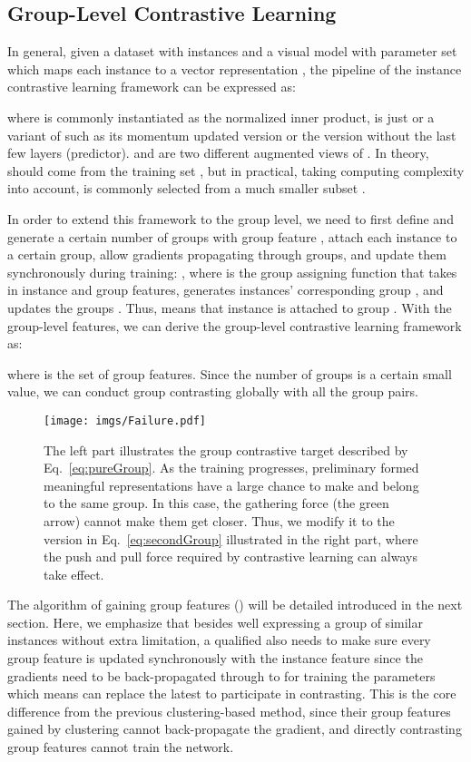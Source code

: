 \documentclass[runningheads]{style/llncs}
\begin{document}
\subsection{Group-Level Contrastive Learning}
In general, given a dataset  with  instances and a visual model  with parameter set  which maps each instance to a vector representation , the pipeline of the instance contrastive learning framework can be expressed as:

where  is commonly instantiated as the normalized inner product,  is just  or a variant of  such as its momentum updated version or the version without the last few layers (predictor).  and  are two different augmented views of . In theory,  should come from the training set , but in practical, taking computing complexity into account,  is commonly selected from a much smaller subset .

In order to extend this framework to the group level, we need to first define and generate a certain number of groups with group feature , attach each instance to a certain group, allow gradients propagating through groups, and update them synchronously during training: , where  is the group assigning function that takes in instance and group features, generates instances' corresponding group , and updates the groups . Thus,  means that instance  is attached to group . With the group-level features, we can derive the group-level contrastive learning framework as:

where  is the set of group features. Since the number of groups is a certain small value, we can conduct group contrasting globally with all the group pairs.

\begin{wrapfigure}[22]{r}{0.6\linewidth}
	\vspace{-0.32in}
	\texttt{[image: imgs/Failure.pdf]}
	\caption{The left part illustrates the group contrastive target described by Eq.~\ref{eq:pureGroup}. As the training progresses, preliminary formed meaningful representations have a large chance to make  and  belong to the same group. In this case, the gathering force (the green arrow) cannot make them get closer. Thus, we modify it to the version in Eq.~\ref{eq:secondGroup} illustrated in the right part, where the push and pull force required by contrastive learning can always take effect.}
	\label{fig:exp_fail}
\end{wrapfigure}

The algorithm of gaining group features () will be detailed introduced in the next section. Here, we emphasize that besides well expressing a group of similar instances without extra limitation, a qualified  also needs to make sure every group feature  is updated synchronously with the instance feature  since the gradients need to be back-propagated through  to  for training the parameters which means  can replace the latest  to participate in contrasting. This is the core difference from the previous clustering-based method, since their group features gained by clustering cannot back-propagate the gradient, and directly contrasting group features cannot train the network.
\end{document}
